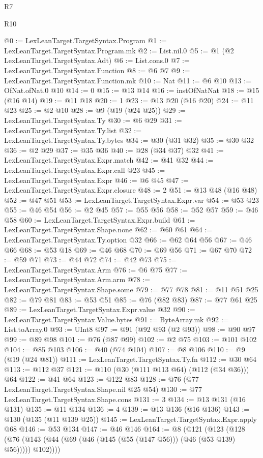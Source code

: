 \begin{lexlean}{R7}
\begin{lexlean}{R10}
\begin{coremodule}
{{{{{{{@0 := LexLeanTarget.TargetSyntax.Program
@1 := LexLeanTarget.TargetSyntax.Program.mk
@2 := List.nil.{0}
@5 := @1 (@2 LexLeanTarget.TargetSyntax.Adt)
@6 := List.cons.{0}
@7 := LexLeanTarget.TargetSyntax.Function
@8 := @6 @7
@9 := LexLeanTarget.TargetSyntax.Function.mk
@10 := Nat
@11 := @6 @10
@13 := OfNat.ofNat.{0} @10
@14 := 0
@15 := @13 @14
@16 := instOfNatNat
@18 := @15 (@16 @14)
@19 := @11 @18
@20 := 1
@23 := @13 @20 (@16 @20)
@24 := @11 @23
@25 := @2 @10
@28 := @9 (@19 (@24 @25))
@29 := LexLeanTarget.TargetSyntax.Ty
@30 := @6 @29
@31 := LexLeanTarget.TargetSyntax.Ty.list
@32 := LexLeanTarget.TargetSyntax.Ty.bytes
@34 := @30 (@31 @32)
@35 := @30 @32
@36 := @2 @29
@37 := @35 @36
@40 := @28 (@34 @37) @32
@41 := LexLeanTarget.TargetSyntax.Expr.match
@42 := @41 @32
@44 := LexLeanTarget.TargetSyntax.Expr.call @23
@45 := LexLeanTarget.TargetSyntax.Expr
@46 := @6 @45
@47 := LexLeanTarget.TargetSyntax.Expr.closure
@48 := 2
@51 := @13 @48 (@16 @48)
@52 := @47 @51
@53 := LexLeanTarget.TargetSyntax.Expr.var
@54 := @53 @23
@55 := @46 @54
@56 := @2 @45
@57 := @55 @56
@58 := @52 @57
@59 := @46 @58
@60 := LexLeanTarget.TargetSyntax.Expr.build
@61 := LexLeanTarget.TargetSyntax.Shape.none
@62 := @60 @61
@64 := LexLeanTarget.TargetSyntax.Ty.option @32
@66 := @62 @64 @56
@67 := @46 @66
@68 := @53 @18
@69 := @46 @68
@70 := @69 @56
@71 := @67 @70
@72 := @59 @71
@73 := @44 @72
@74 := @42 @73
@75 := LexLeanTarget.TargetSyntax.Arm
@76 := @6 @75
@77 := LexLeanTarget.TargetSyntax.Arm.arm
@78 := LexLeanTarget.TargetSyntax.Shape.some
@79 := @77 @78
@81 := @11 @51 @25
@82 := @79 @81
@83 := @53 @51
@85 := @76 (@82 @83)
@87 := @77 @61 @25
@89 := LexLeanTarget.TargetSyntax.Expr.value @32
@90 := LexLeanTarget.TargetSyntax.Value.bytes
@91 := ByteArray.mk
@92 := List.toArray.{0}
@93 := UInt8
@97 := @91 (@92 @93 (@2 @93))
@98 := @90 @97
@99 := @89 @98
@101 := @76 (@87 @99)
@102 := @2 @75
@103 := @101 @102
@104 := @85 @103
@106 := @40 (@74 @104)
@107 := @8 @106
@110 := @9 (@19 (@24 @81))
@111 := LexLeanTarget.TargetSyntax.Ty.fn
@112 := @30 @64
@113 := @112 @37
@121 := @110 (@30 (@111 @113 @64) (@112 (@34 @36))) @64
@122 := @41 @64
@123 := @122 @83
@128 := @76 (@77 LexLeanTarget.TargetSyntax.Shape.nil @25 @54)
@130 := @77 LexLeanTarget.TargetSyntax.Shape.cons
@131 := 3
@134 := @13 @131 (@16 @131)
@135 := @11 @134
@136 := 4
@139 := @13 @136 (@16 @136)
@143 := @130 (@135 (@11 @139 @25))
@145 := LexLeanTarget.TargetSyntax.Expr.apply @68
@146 := @53 @134
@147 := @46 @146
@164 := @8
    (@121
      (@123
        (@128 (@76 (@143 (@44 (@69 (@46 (@145 (@55 (@147 @56))) (@46 (@53 @139) @56))))) @102))))
}}}}}}}
\end{coremodule}
\end{lexlean}
\end{lexlean}

